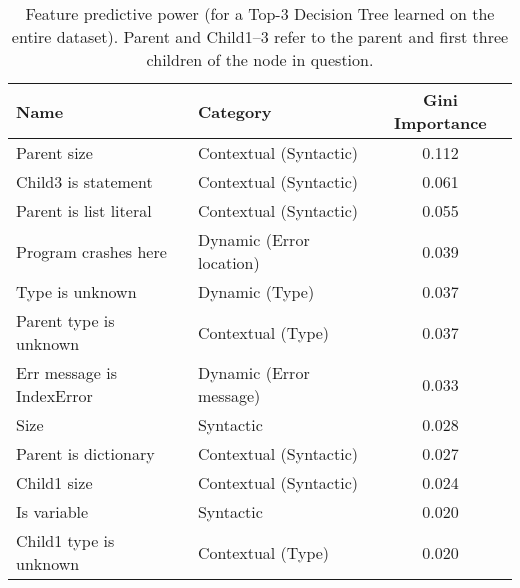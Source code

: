 \documentclass[conference]{IEEEtran}
\begin{document}
\begin{table}[]
\begin{tabular}{llc}
Name                      & Category                & Gini Importance \\ \bottomrule
Parent size                    & Contextual (Syntactic)  & 0.112 \\
Child3 is statement           & Contextual (Syntactic)  & 0.061 \\
Parent is list literal         & Contextual (Syntactic)  & 0.055 \\
Program crashes here      & Dynamic (Error location)& 0.039 \\
Type is unknown           & Dynamic (Type)          & 0.037 \\
Parent type is unknown         & Contextual (Type)       & 0.037 \\
Err message is IndexError & Dynamic (Error message) & 0.033 \\
Size                      & Syntactic               & 0.028 \\
Parent is dictionary & Contextual (Syntactic)  & 0.027 \\
Child1 size                   & Contextual (Syntactic)  & 0.024 \\
Is variable               & Syntactic               & 0.020 \\
Child1 type is unknown        & Contextual (Type)       & 0.020 \\
\toprule
\end{tabular}
\caption{Feature predictive power (for a Top-3 Decision Tree
learned on the entire dataset). Parent and Child1--3 refer to the parent and
first three children of the node in question.}
\label{tab-feature-predictive-power}
\end{table}
\end{document}
